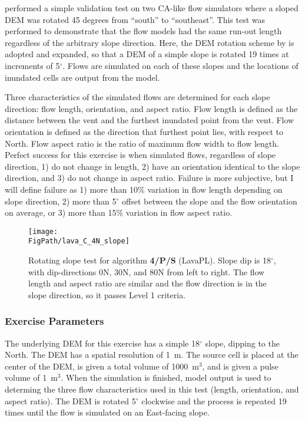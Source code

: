		\citet{miyamoto1997simulating} performed a simple validation test on two CA-like flow simulators \citep{ishihara1990numerical,miyamoto1997simulating} where a sloped DEM was rotated 45 degrees from ``south'' to ``southeast''. This test was performed to demonstrate that the flow models had the same run-out length regardless of the arbitrary slope direction. Here, the DEM rotation scheme by \citet{miyamoto1997simulating} is adopted and expanded, so that a DEM of a simple slope is rotated 19 times at increments of 5$^{\circ}$. Flows are simulated on each of these slopes and the locations of inundated cells are output from the model.
		
		Three characteristics of the simulated flows are determined for each slope direction: flow length, orientation, and aspect ratio. Flow length is defined as the distance between the vent and the furthest inundated point from the vent. Flow orientation is defined as the direction that furthest point lies, with respect to North. Flow aspect ratio is the ratio of maximum flow width to flow length. Perfect success for this exercise is when simulated flows, regardless of slope direction, 1) do not change in length, 2) have an orientation identical to the slope direction, and 3) do not change in aspect ratio. Failure is more subjective, but I will define failure as 1) more than 10\% variation in flow length depending on slope direction, 2) more than 5$^{\circ}$ offset between the slope and the flow orientation on average, or 3) more than 15\% variation in flow aspect ratio.
		
		\begin{figure}[h!]
			\centering
			\texttt{[image: \\FigPath/lava\_C\_4N\_slope]}
			\caption[Rotating slope test for the LavaPL algorithm]{Rotating slope test for algorithm \textbf{4/P/S} (LavaPL). Slope dip is 18$^{\circ}$, with dip-directions 0N, 30N, and 80N from left to right. The flow length and aspect ratio are similar and the flow direction is in the slope direction, so it passes Level 1 criteria.}
			\label{fig:slope}
		\end{figure}
		
		\subsubsection{Exercise Parameters} The underlying DEM for this exercise has a simple 18$^{\circ}$ slope, dipping to the North. The DEM has a spatial resolution of 1~m. The source cell is placed at the center of the DEM, is given a total volume of 1000~m$^3$, and is given a pulse volume of 1~m$^3$. When the simulation is finished, model output is used to determing the three flow characteristics used in this test (length, orientation, and aspect ratio). The DEM is rotated 5$^{\circ}$ clockwise and the process is repeated 19 times until the flow is simulated on an East-facing slope.
		
